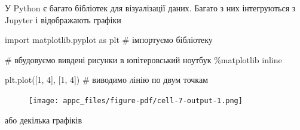 \documentclass[
  letterpaper,
]{report}
\newenvironment{Shaded}{\begin{snugshade}}{\end{snugshade}}
\newcommand{\CommentTok}[1]{\textcolor[rgb]{0.37,0.37,0.37}{#1}}
\newcommand{\DecValTok}[1]{\textcolor[rgb]{0.68,0.00,0.00}{#1}}
\newcommand{\ImportTok}[1]{\textcolor[rgb]{0.00,0.46,0.62}{#1}}
\newcommand{\NormalTok}[1]{\textcolor[rgb]{0.00,0.23,0.31}{#1}}
\newcommand{\OperatorTok}[1]{\textcolor[rgb]{0.37,0.37,0.37}{#1}}
\begin{document}
У Python є багато бібліотек для візуалізації даних. Багато з них
інтегруються з Jupyter і відображають графіки

\begin{Shaded}
\begin{Highlighting}[]
\ImportTok{import}\NormalTok{ matplotlib.pyplot }\ImportTok{as}\NormalTok{ plt }\CommentTok{\# імпортуємо бібліотеку}

\CommentTok{\# вбудовуємо вивдені рисунки в юпітеровський ноутбук}
\OperatorTok{\%}\NormalTok{matplotlib inline}

\NormalTok{plt.plot([}\DecValTok{1}\NormalTok{, }\DecValTok{4}\NormalTok{], [}\DecValTok{1}\NormalTok{, }\DecValTok{4}\NormalTok{]) }\CommentTok{\# виводимо лінію по двум точкам}
\end{Highlighting}
\end{Shaded}

\begin{figure}[H]

{\centering \texttt{[image: appc\_files/figure-pdf/cell-7-output-1.png]}

}

\end{figure}

або декілька графіків
\end{document}
